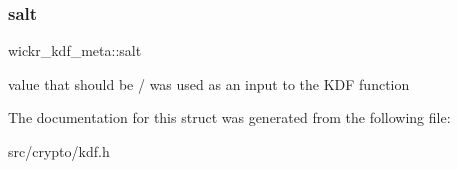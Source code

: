 \subsubsection{\texorpdfstring{salt}{salt}}
{\footnotesize\ttfamily wickr\+\_\+kdf\+\_\+meta\+::salt}

value that should be / was used as an input to the K\+DF function 

The documentation for this struct was generated from the following file\+:\begin{DoxyCompactItemize}
\item 
src/crypto/kdf.\+h\end{DoxyCompactItemize}
